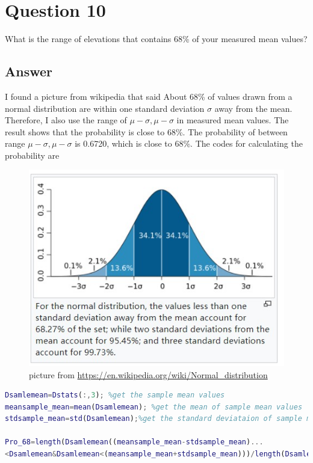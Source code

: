 \documentclass[
	12pt, %
]{fphw}
\begin{document}
 
 \section*{Question 10 }
 
 \begin{problem}
 What is the range of elevations that contains 68\% of your measured mean values?
 	
 \end{problem}
 
 \subsection*{Answer}
 
I found a picture from wikipedia that said About 68\% of values drawn from a normal distribution are within one standard deviation $\sigma$ away from the mean. Therefore, I also use the range of  $\mu-\sigma,\mu-\sigma$ in measured mean values. The result shows that the probability is close to 68\%. The probability of between range $\mu-\sigma,\mu-\sigma$ is 0.6720, which is close to 68\%. The codes for calculating the probability are

\begin{figure}[htbp]
	\centering
	\includegraphics[width=0.8\columnwidth]{wiki.jpg} 
	\caption{picture from \url{https://en.wikipedia.org/wiki/Normal\_distribution}}
\end{figure}
 
\begin{lstlisting}[language=Matlab,escapeinside=``]
Dsamlemean=Dstats(:,3); %get the sample mean values
meansample_mean=mean(Dsamlemean); %get the mean of sample mean values
stdsample_mean=std(Dsamlemean);%get the standard deviataion of sample mean values

Pro_68=length(Dsamlemean((meansample_mean-stdsample_mean)...
<Dsamlemean&Dsamlemean<(meansample_mean+stdsample_mean)))/length(Dsamlemean)%use the range \mu-\sigma,\mu-\sigma to get probability
\end{lstlisting}
 
\end{document}

